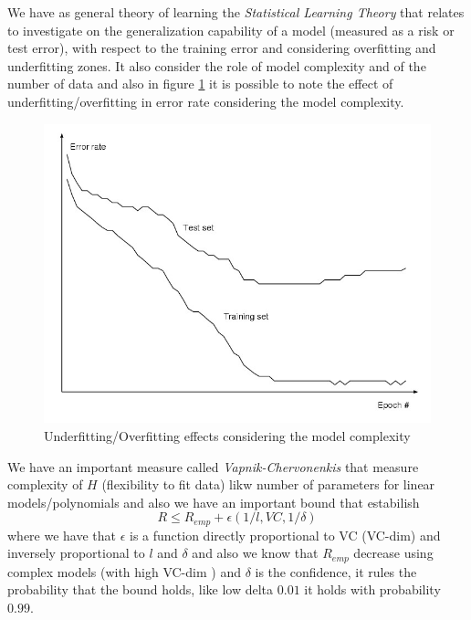 We have as general theory of learning the \emph{Statistical Learning Theory} that relates to investigate on the generalization capability of a model 
(measured as a risk or test error), with respect to the training error and considering overfitting and underfitting zones.\newline
It also consider the role of model complexity and of the number of data and also in figure \ref{img:overfitting} it is possible to note the effect
of underfitting/overfitting in error rate considering the model complexity.
\begin{figure}
    \caption{Underfitting/Overfitting effects considering the model complexity}
    \label{img:overfitting}
    \includegraphics[width=\textwidth]{images/overfitting}
\end{figure}
We have an important measure called \emph{Vapnik-Chervonenkis} that measure complexity of $H$ (flexibility to fit data) likw number of parameters 
for linear models/polynomials and also we have an important bound that estabilish 
\[ R \leq R_{emp} + \epsilon (1 / l, VC, 1 / \delta) \]
where we have that $\epsilon$ is a function directly proportional to VC (VC-dim) and inversely proportional to $l$ and $\delta$ and also we 
know that $R_{emp}$ decrease using complex models (with high VC-dim ) and $\delta$ is the confidence, it rules the probability that the bound holds, like
low delta $0.01$ it holds with probability $0.99$.

